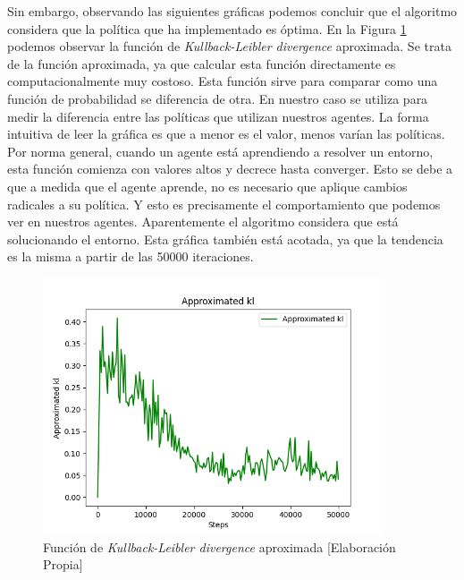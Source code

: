 Sin embargo, observando las siguientes gráficas podemos concluir que el algoritmo considera que la política que ha implementado es óptima. En la Figura \ref{fig:kl} podemos observar la función de \textit{Kullback-Leibler divergence} aproximada. Se trata de la función aproximada, ya que calcular esta función directamente es computacionalmente muy costoso. Esta función sirve para comparar como una función de probabilidad se diferencia de otra. En nuestro caso se utiliza para medir la diferencia entre las políticas que utilizan nuestros agentes. La forma intuitiva de leer la gráfica es que a menor es el valor, menos varían las políticas. Por norma general, cuando un agente está aprendiendo a resolver un entorno, esta función comienza con valores altos y decrece hasta converger. Esto se debe a que a medida que el agente aprende, no es necesario que aplique cambios radicales a su política. Y esto es precisamente el comportamiento que podemos ver en nuestros agentes. Aparentemente el algoritmo considera que está solucionando el entorno. Esta gráfica también está acotada, ya que la tendencia es la misma a partir de las 50000 iteraciones.
\begin{figure}[ht]
    \centering
    \includegraphics[width=0.9\textwidth]{img/approx_kl.png}
    \caption{Función de \textit{Kullback-Leibler divergence} aproximada [Elaboración Propia]}
    \label{fig:kl}
\end{figure}

